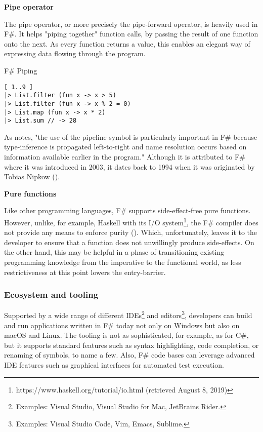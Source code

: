 \textbf{Pipe operator}

The pipe operator, or more precisely the pipe-forward operator, is heavily used in F\#. It helps "piping together" function calls, by passing the result of one function onto the next. As every function returns a value, this enables an elegant way of expressing data flowing through the program.

\begin{listing}[H]
\caption{F\# Piping}
\begin{verbatim}
[ 1..9 ]
|> List.filter (fun x -> x > 5)
|> List.filter (fun x -> x % 2 = 0)
|> List.map (fun x -> x * 2)
|> List.sum // -> 28
\end{verbatim}
\end{listing}

As \cite{syme_early_2018} notes, "the use of the pipeline symbol is particularly important in F\# because type-inference is propagated left-to-right and name resolution occurs based on information available earlier in the program." Although it is attributed to F\# where it was introduced in 2003, it dates back to 1994 when it was originated by Tobias Nipkow (\cite{syme_archeological_2011}).

\textbf{Pure functions}

Like other programming languages, F\# supports side-effect-free pure functions. However, unlike, for example, Haskell with its I/O system\footnote{https://www.haskell.org/tutorial/io.html (retrieved August 8, 2019)}, the F\# compiler does not provide any means to enforce purity (\cite{seemann_functional_2018}). Which, unfortunately, leaves it to the developer to ensure that a function does not unwillingly produce side-effects. On the other hand, this may be helpful in a phase of transitioning existing programming knowledge from the imperative to the functional world, as less restrictiveness at this point lowers the entry-barrier.

\subsubsection{Ecosystem and tooling}

Supported by a wide range of different IDEs\footnote{Examples: Visual Studio, Visual Studio for Mac, JetBrains Rider.} and editors\footnote{Examples: Visual Studio Code, Vim, Emacs, Sublime.}, developers can build and run applications written in F\# today not only on Windows but also on macOS and Linux. The tooling is not as sophisticated, for example, as for C\#, but it supports standard features such as syntax highlighting, code completion, or renaming of symbols, to name a few.  Also, F\# code bases can leverage advanced IDE features such as graphical interfaces for automated test execution.

